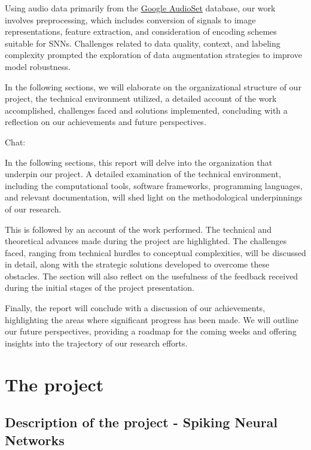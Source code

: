 \documentclass[11pt]{article}
\begin{document}
Using audio data primarily from the \href{https://research.google.com/audioset/}{Google AudioSet} database, our work involves preprocessing, which includes conversion of signals to image representations, feature extraction, and consideration of encoding schemes suitable for SNNs. Challenges related to data quality, context, and labeling complexity prompted the exploration of data augmentation strategies to improve model robustness.

In the following sections, we will elaborate on the organizational structure of our project, the technical environment utilized, a detailed account of the work accomplished, challenges faced and solutions implemented, concluding with a reflection on our achievements and future perspectives.

Chat:

In the following sections, this report will delve into the organization that underpin our project. A detailed examination of the technical environment, including the computational tools, software frameworks, programming languages, and relevant documentation, will shed light on the methodological underpinnings of our research.

This is followed by an account of the work performed. The technical and theoretical advances made during the project are highlighted. The challenges faced, ranging from technical hurdles to conceptual complexities, will be discussed in detail, along with the strategic solutions developed to overcome these obstacles. The section will also reflect on the usefulness of the feedback received during the initial stages of the project presentation.

Finally, the report will conclude with a discussion of our achievements, highlighting the areas where significant progress has been made. We will outline our future perspectives, providing a roadmap for the coming weeks and offering insights into the trajectory of our research efforts.





\pagebreak

\section{The project}

\subsection{Description of the project - Spiking Neural Networks}
\end{document}
